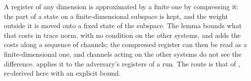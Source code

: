 
A register of any dimension is approximated by a finite one by compressing
it: the part of a state on a finite-dimensional subspace is kept, and the
weight outside it is moved onto a fixed state of the subspace. The lemma
bounds what that costs in trace norm, with no condition on the other systems,
and adds the costs along a sequence of channels; the compressed register can
then be read as a finite-dimensional one, and channels acting on the other
systems do not see the difference.  applies
it to the adversary's registers of a run. The route is that of
\cite[Def.~A.1, Lemma~A.1, Eqs.~(A2)--(A5)]{tupkary2026decoy}, re-derived
here with an explicit bound.

